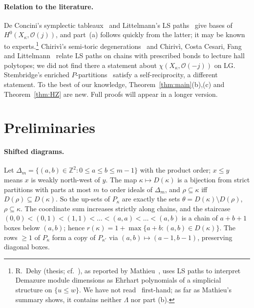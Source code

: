 \documentclass[submission]{FPSAC2027}
\theoremstyle{definition}
\theoremstyle{remark}
\newcommand{\LG}{\mathrm{LG}}
\newcommand{\cO}{\mathcal{O}}
\newcommand{\Z}{\mathbb{Z}}
\begin{document}
\paragraph{Relation to the literature.} De Concini's symplectic tableaux~\cite{DeC79} and
Littelmann's LS paths~\cite{Lit94} give bases of $H^0(X_\kappa,\cO(j))$, and part~(a) follows
quickly from the latter; it may be known to experts.\footnote{R.~Dehy (thesis; cf.~\cite{Dehy98}), as reported
by Mathieu~\cite[\S4]{Mat95}, uses LS paths to interpret Demazure module dimensions as Ehrhart
polynomials of a simplicial structure on $\{u\le w\}$. We have not read~\cite{Dehy98} first-hand;
as far as Mathieu's summary shows, it contains neither $\Lambda$ nor part (b).} Chirivì's
semi-toric degenerations~\cite{Chi00} and Chirivì, Costa Cesari, Fang and Littelmann~\cite{CCFL}
relate LS paths on chains with prescribed bonds to lecture hall polytopes; we did not find there a
statement about $\chi(X_\kappa,\cO(-j))$ on $\LG$. Stembridge's enriched
$P$-partitions~\cite{Stem97} satisfy a self-reciprocity, a different statement. To the best of our
knowledge, Theorem~\ref{thm:main}(b),(c) and Theorem~\ref{thm:HZ} are new. Full proofs will
appear in a longer version.

\section{Preliminaries}\label{sec:prelim}

\paragraph{Shifted diagrams.} Let $\Delta_m=\{(a,b)\in\Z^2:0\le a\le b\le m-1\}$ with the product
order; $x\le y$ means $x$ is weakly north-west of $y$. The map $\kappa\mapsto D(\kappa)$ is a
bijection from strict partitions with parts at most $m$ to order ideals of $\Delta_m$, and
$\rho\subseteq\kappa$ iff $D(\rho)\subseteq D(\kappa)$. So the up-sets of $P_\kappa$ are exactly
the sets $\theta=D(\kappa)\setminus D(\rho)$, $\rho\subseteq\kappa$. The coordinate sum increases
strictly along chains, and the staircase $(0,0)<(0,1)<(1,1)<\dots<(a,a)<\dots<(a,b)$ is a chain of
$a+b+1$ boxes below $(a,b)$; hence $r(\kappa)=1+\max\{a+b:(a,b)\in D(\kappa)\}$. The rows $\ge1$ of
$P_\kappa$ form a copy of $P_{\kappa'}$ via $(a,b)\mapsto(a-1,b-1)$, preserving diagonal boxes.
\end{document}
